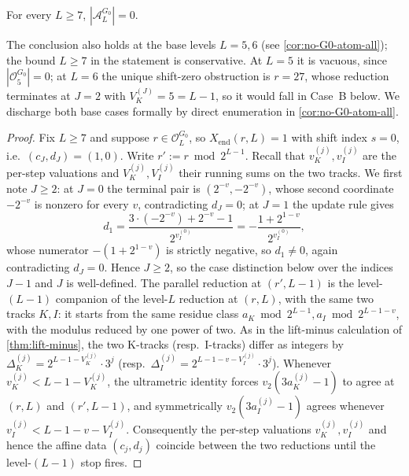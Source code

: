 \documentclass[11pt,reqno]{amsart}
\newcommand{\Obs}{\mathcal{O}}
\newcommand{\Atom}{\mathcal{A}}
\newcommand{\Xend}{X_{\mathrm{end}}}
\newcommand{\Vk}{V_{K}}
\newcommand{\Vi}{V_{I}}
\newcommand{\vk}{v_{K}}
\newcommand{\vi}{v_{I}}
\begin{document}
\begin{theorem}\label{thm:no-G0-atom}
For every $L \ge 7$, $|\Atom_L^{G_0}| = 0$.
\end{theorem}

The conclusion also holds at the base levels $L = 5, 6$ (see
\cref{cor:no-G0-atom-all}); the bound $L \ge 7$ in the statement
is conservative. At $L = 5$ it is vacuous, since $|\Obs_5^{G_0}| = 0$;
at $L = 6$ the unique shift-zero obstruction is $r = 27$, whose
reduction terminates at $J = 2$ with $\Vk^{(J)} = 5 = L - 1$, so it
would fall in Case~B below. We discharge both base cases formally by
direct enumeration in \cref{cor:no-G0-atom-all}.

\begin{proof}
Fix $L \ge 7$ and suppose $r \in \Obs_L^{G_0}$, so $\Xend(r, L) = 1$ with
shift index $s = 0$, i.e.\ $(c_J, d_J) = (1, 0)$. Write $r' := r \bmod 2^{L-1}$.
Recall that $\vk^{(j)}, \vi^{(j)}$ are the per-step valuations and
$\Vk^{(j)}, \Vi^{(j)}$ their running sums on the two tracks.
We first note $J \ge 2$: at $J = 0$ the terminal pair is $(2^{-v}, -2^{-v})$,
whose second coordinate $-2^{-v}$ is nonzero for every $v$, contradicting
$d_J = 0$; at $J = 1$ the update rule gives
\[
d_1 = \frac{3 \cdot (-2^{-v}) + 2^{-v} - 1}{2^{\vi^{(0)}}} = -\frac{1 + 2^{1-v}}{2^{\vi^{(0)}}},
\]
whose numerator $-(1 + 2^{1-v})$ is strictly negative, so $d_1 \ne 0$, again
contradicting $d_J = 0$. Hence $J \ge 2$, so the case
distinction below over the indices $J - 1$ and $J$ is well-defined.
The parallel reduction at $(r', L-1)$ is the level-$(L-1)$ companion of the
level-$L$ reduction at $(r, L)$, with the same two tracks $K, I$: it starts from
the same residue class $a_K \bmod 2^{L-1}, a_I \bmod 2^{L-1-v}$, with the
modulus reduced by one power of two. As in the lift-minus calculation of
\cref{thm:lift-minus}, the two K-tracks (resp.\ I-tracks) differ as integers by
$\Delta_K^{(j)} = 2^{L-1-\Vk^{(j)}} \cdot 3^j$ (resp.\
$\Delta_I^{(j)} = 2^{L-1-v-\Vi^{(j)}} \cdot 3^j$). Whenever
$\vk^{(j)} < L - 1 - \Vk^{(j)}$, the ultrametric identity forces
$v_2(3 a_K^{(j)} - 1)$ to agree at $(r, L)$ and $(r', L-1)$, and symmetrically
$v_2(3 a_I^{(j)} - 1)$ agrees whenever $\vi^{(j)} < L - 1 - v - \Vi^{(j)}$.
Consequently the
per-step valuations $\vk^{(j)}, \vi^{(j)}$ and hence the affine data
$(c_j, d_j)$ coincide between the two reductions until the level-$(L-1)$
stop fires.


\end{proof}
\end{document}
